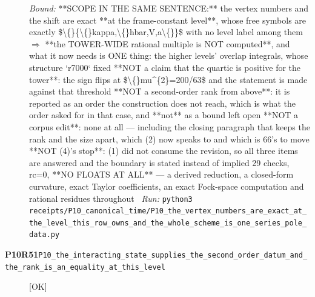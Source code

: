 \begin{description}
 \emph{Bound:}  **SCOPE IN THE SAME SENTENCE:** the vertex numbers and the shift are exact **at the frame-constant level**, whose free symbols are exactly \$\textbackslash\{\}\{\textbackslash\{\}kappa,\textbackslash\{\}hbar,V,a\textbackslash\{\}\}\$ with no level label among them \ensuremath{\Rightarrow} **the TOWER-WIDE rational multiple is NOT computed**, and what it now needs is ONE thing: the higher levels' overlap integrals, whose structure `r7000` fixed  **NOT a claim that the quartic is positive for the tower**: the sign flips at \$\textbackslash\{\}mu\textasciicircum{}\{2\}=200/63\$ and the statement is made against that threshold  **NOT a second-order rank from above**: it is reported as an order the construction does not reach, which is what the order asked for in that case, and **not** as a bound left open  **NOT a corpus edit**: none at all --- including the closing paragraph that keeps the rank and the size apart, which (2) now speaks to and which is 66's to move  **NOT (4)'s stop**: (1) did not consume the revision, so all three items are answered and the boundary is stated instead of implied  29 checks, rc=0, **NO FLOATS AT ALL** --- a derived reduction, a closed-form curvature, exact Taylor coefficients, an exact Fock-space computation and rational residues throughout
\ \emph{Run:} \texttt{python3 receipts/P10\_canonical\_time/P10\_the\_vertex\_numbers\_are\_exact\_at\_the\_level\_this\_row\_owns\_and\_the\_whole\_scheme\_is\_one\_series\_pole\_data.py}
\item[\rcptlabel{P10_the_interacting_state_supplies_the_second_order_datum_and_the_rank_is_an_equality_at_this_level}{P10R51}\textbf{P10R51}\quad\texttt{P10\_the\_interacting\_state\_supplies\_the\_second\_order\_datum\_and\_the\_rank\_is\_an\_equality\_at\_this\_level}]\hfill\textsf{[OK]}\\

\end{description}
